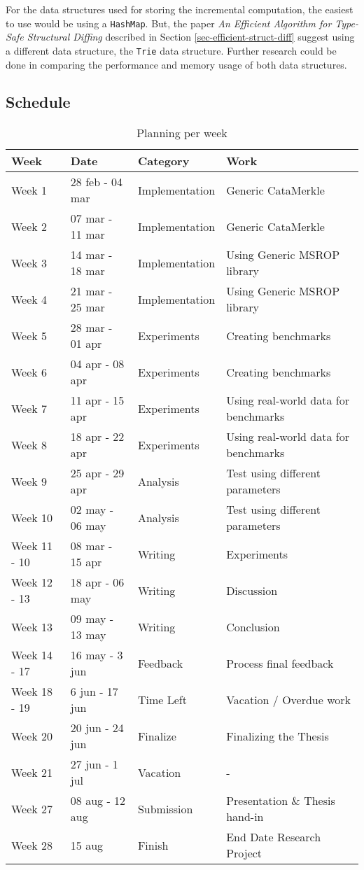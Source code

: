 For the data structures used for storing the incremental computation, the easiest to use would be using a \texttt{HashMap}. But, the paper \textit{An Efficient Algorithm for Type-Safe Structural Diffing} described in Section \ref{sec-efficient-struct-diff} suggest using a different data structure, the \texttt{Trie} data structure. Further research could be done in comparing the performance and memory usage of both data structures.

\newpage
\subsection{Schedule}
\begin{table}[H]
\setlength{\tabcolsep}{8pt}
\centering
\small
\bigskip
\begin{tabularx}{0.965\textwidth}{|l|l|l|l|}
    \hline
    Week & Date & Category & Work \\
    \hline
    Week 1 & 28 feb - 04 mar & Implementation & Generic CataMerkle \\
    Week 2 & 07 mar - 11 mar & Implementation & Generic CataMerkle \\
    Week 3 & 14 mar - 18 mar & Implementation & Using Generic MSROP library \\
    Week 4 & 21 mar - 25 mar & Implementation & Using Generic MSROP library \\
    \hline
    Week 5 & 28 mar - 01 apr & Experiments & Creating benchmarks \\
    Week 6 & 04 apr - 08 apr & Experiments & Creating benchmarks \\
    Week 7 & 11 apr - 15 apr & Experiments & Using real-world data for benchmarks \\
    Week 8 & 18 apr - 22 apr & Experiments & Using real-world data for benchmarks \\
    \hline
    Week 9 & 25 apr - 29 apr & Analysis & Test using different parameters  \\
    Week 10 & 02 may - 06 may & Analysis & Test using different parameters  \\
    \hline
    Week 11 - 10 & 08 mar - 15 apr & Writing & Experiments \\
    Week 12 - 13 & 18 apr - 06 may & Writing & Discussion \\
    Week 13 & 09 may - 13 may & Writing & Conclusion \\
    \hline
    Week 14 - 17 & 16 may - 3 jun & Feedback & Process final feedback \\
    \hline
    Week 18 - 19 & 6 jun - 17 jun & Time Left & Vacation / Overdue work \\
    \hline
    Week 20 & 20 jun - 24 jun & Finalize & Finalizing the Thesis \\
    \hline
    Week 21 & 27 jun - 1 jul & Vacation & - \\
    \hline
    Week 27 & 08 aug - 12 aug & Submission & Presentation \& Thesis hand-in \\
    \hline 
    Week 28 & 15 aug & Finish & End Date Research Project \\
    \hline
\end{tabularx}
\caption{Planning per week}
\label{table:planning}
\end{table}